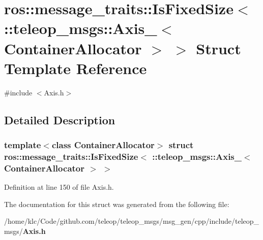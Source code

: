 \section{ros::message\_\-traits::IsFixedSize$<$ ::teleop\_\-msgs::Axis\_\-$<$ ContainerAllocator $>$ $>$ Struct Template Reference}
\label{structros_1_1message__traits_1_1IsFixedSize_3_01_1_1teleop__msgs_1_1Axis___3_01ContainerAllocator_01_4_01_4}


{\ttfamily \#include $<$Axis.h$>$}



\subsection{Detailed Description}
\subsubsection*{template$<$class ContainerAllocator$>$ struct ros::message\_\-traits::IsFixedSize$<$ ::teleop\_\-msgs::Axis\_\-$<$ ContainerAllocator $>$ $>$}



Definition at line 150 of file Axis.h.



The documentation for this struct was generated from the following file:\begin{DoxyCompactItemize}
\item 
/home/klc/Code/github.com/teleop/teleop\_\-msgs/msg\_\-gen/cpp/include/teleop\_\-msgs/{\bf Axis.h}\end{DoxyCompactItemize}

